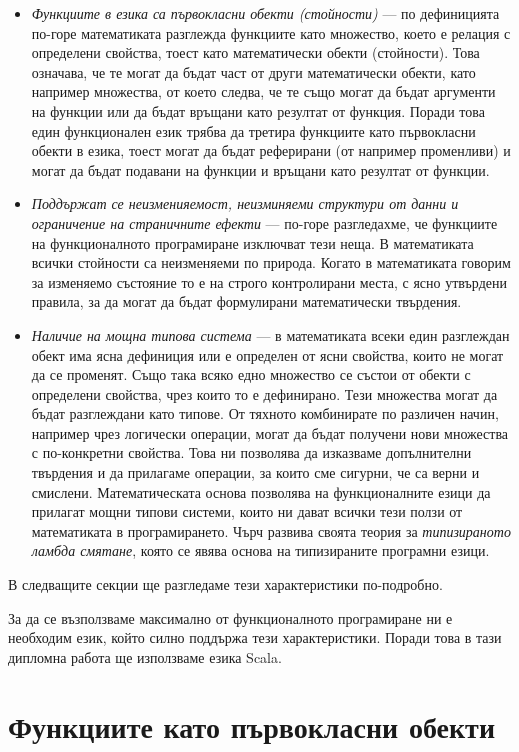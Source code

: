 \begin{itemize}
  \item \emph{Функциите в езика са първокласни обекти (стойности)} — по дефиницията по-горе математиката разглежда функциите като множество, което е релация с определени свойства, тоест като математически обекти (стойности). Това означава, че те могат да бъдат част от други математически обекти, като например множества, от което следва, че те също могат да бъдат аргументи на функции или да бъдат връщани като резултат от функция. Поради това един функционален език трябва да третира функциите като първокласни обекти в езика, тоест могат да бъдат реферирани (от например променливи) и могат да бъдат подавани на функции и връщани като резултат от функции.
  \item \emph{Поддържат се неизменияемост, неизминяеми структури от данни и ограничение на страничните ефекти} — по-горе разгледахме, че функциите на функционалното програмиране изключват тези неща. В математиката всички стойности са неизменяеми по природа. Когато в математиката говорим за изменяемо състояние то е на строго контролирани места, с ясно утвърдени правила, за да могат да бъдат формулирани математически твърдения.
  \item \emph{Наличие на мощна типова система} — в математиката всеки един разглеждан обект има ясна дефиниция или е определен от ясни свойства, които не могат да се променят. Също така всяко едно множество се състои от обекти с определени свойства, чрез които то е дефинирано. Тези множества могат да бъдат разглеждани като типове. От тяхното комбинирате по различен начин, например чрез логически операции, могат да бъдат получени нови множества с по-конкретни свойства. Това ни позволява да изказваме допълнителни твърдения и да прилагаме операции, за които сме сигурни, че са верни и смислени. Математическата основа позволява на функционалните езици да прилагат мощни типови системи, които ни дават всички тези ползи от математиката в програмирането. Чърч  развива своята теория за \emph{типизираното ламбда смятане}, която се явява основа на типизираните програмни езици.
\end{itemize}

В следващите секции ще разгледаме тези характеристики по-подробно.

За да се възползваме максимално от функционалното програмиране ни е необходим език, който силно поддържа тези характеристики. Поради това в тази дипломна работа ще използваме езика Scala.

\section{Функциите като първокласни обекти}

